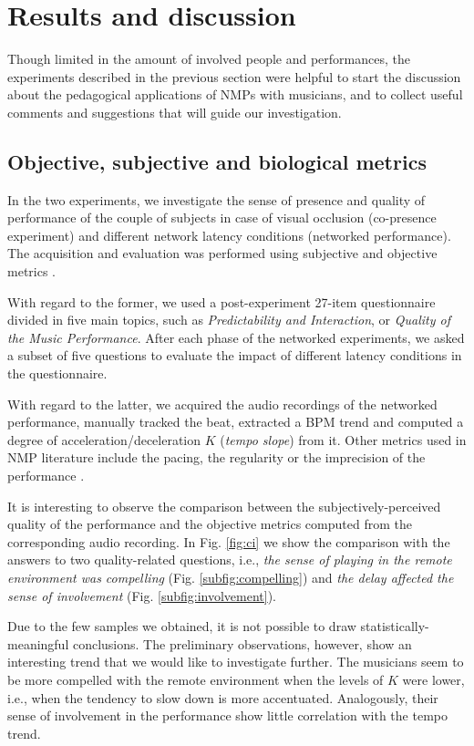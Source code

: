 \documentclass[conference]{IEEEtran}
\begin{document}
\section{Results and discussion}\label{sec:discussion}
Though limited in the amount of involved people and performances, the experiments described in the previous section were helpful to start the discussion about the pedagogical applications of NMPs with musicians, and to collect useful comments and suggestions that will guide our investigation. 


\subsection{Objective, subjective and biological metrics}\label{subsec:metrics}
In the two experiments, we investigate the sense of presence and quality of performance of the couple of subjects in case of visual occlusion (co-presence experiment) and different network latency conditions (networked performance). The acquisition and evaluation was performed using subjective and objective metrics \cite{CIM2018}. 

With regard to the former, we used a post-experiment 27-item questionnaire divided in five main topics, such as \textit{Predictability and Interaction}, or \textit{Quality of the Music Performance}. After each phase of the networked experiments, we asked a subset of five questions to evaluate the impact of different latency conditions in the questionnaire.

With regard to the latter, we acquired the audio recordings of the networked performance, manually tracked the beat, extracted a BPM trend and computed a degree of acceleration/deceleration $K$  (\textit{tempo slope}) from it. Other metrics used in NMP literature include the pacing, the regularity or the imprecision of the performance \cite{RottondiOverview}.

It is interesting to observe the comparison between the subjectively-perceived quality of the performance and the  objective metrics computed from the corresponding audio recording. In Fig. \ref{fig:ci} we show the comparison with the answers to two quality-related questions, i.e., \textit{the sense of playing in the remote environment was compelling} (Fig. \ref{subfig:compelling}) and \textit{the delay affected the sense of involvement} (Fig. \ref{subfig:involvement}).

Due to the few samples we obtained, it is not possible to draw statistically-meaningful conclusions. The preliminary observations, however, show an interesting trend that we would like to investigate further. The musicians seem to be more compelled with the remote environment when the levels of $K$ were lower, i.e., when the tendency to slow down is more accentuated. Analogously, their sense of involvement in the performance show little correlation with the tempo trend. 
\end{document}
